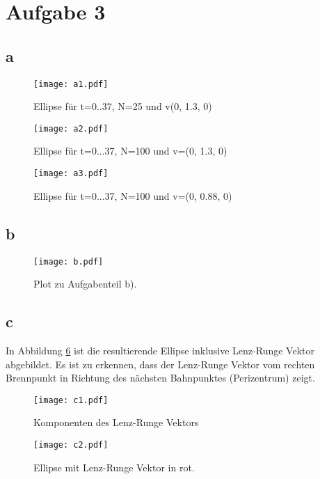 \documentclass[paper=a4, ngerman]{scrartcl}
\begin{document}
\section{Aufgabe 3}
\subsection{a}

\begin{figure}[htbp]
	\centering
	\texttt{[image: a1.pdf]}
	\caption{Ellipse für t=0..37, N=25  und v(0, 1.3, 0)}
	\label{fig:a1}
\end{figure}

\begin{figure}[htbp]
	\centering
	\texttt{[image: a2.pdf]}
	\caption{Ellipse für t=0...37, N=100 und v=(0, 1.3, 0)}
	\label{fig:a2}
\end{figure}

\begin{figure}[htbp]
	\centering
	\texttt{[image: a3.pdf]}
	\caption{Ellipse für t=0...37, N=100 und v=(0, 0.88, 0)}
	\label{fig:a3}
\end{figure}
\FloatBarrier
\subsection{b}
\begin{figure}[htbp]
	\centering
	\texttt{[image: b.pdf]}
	\caption{Plot zu Aufgabenteil b).}
	\label{fig:b}
\end{figure}

\FloatBarrier
\subsection{c}
In Abbildung \ref{fig:c2} ist die resultierende Ellipse inklusive Lenz-Runge Vektor abgebildet. Es ist zu erkennen, dass der Lenz-Runge Vektor vom rechten Brennpunkt in Richtung des nächsten Bahnpunktes (Perizentrum) zeigt.
\begin{figure}[htbp]
	\centering
	\texttt{[image: c1.pdf]}
	\caption{Komponenten des Lenz-Runge Vektors}
	\label{fig:c1}
\end{figure}

\begin{figure}[htbp]
	\centering
	\texttt{[image: c2.pdf]}
	\caption{Ellipse mit Lenz-Runge Vektor in rot.}
	\label{fig:c2}
\end{figure}
\end{document}

